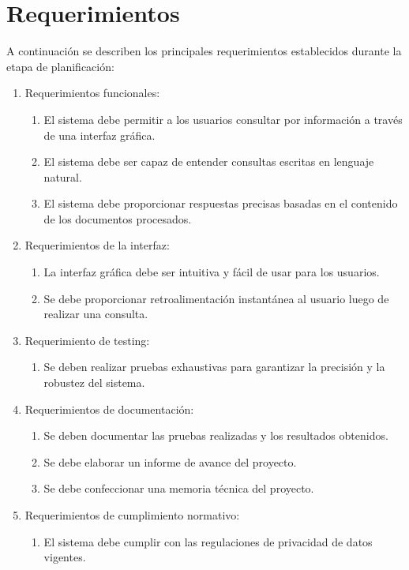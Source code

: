 \vspace{10mm}

\section{Requerimientos}

A continuación se describen los principales requerimientos establecidos durante la etapa de planificación:

\begin{enumerate}
	\item Requerimientos funcionales:
		\begin{enumerate}
			\item El sistema debe permitir a los usuarios consultar por información a través de una interfaz gráfica.
			\item El sistema debe ser capaz de entender consultas escritas en lenguaje natural.
			\item El sistema debe proporcionar respuestas precisas basadas en el contenido de los documentos procesados.
		\end{enumerate}
	\item Requerimientos de la interfaz:
		\begin{enumerate}
	  		\item La interfaz gráfica debe ser intuitiva y fácil de usar para los usuarios.
	  		\item Se debe proporcionar retroalimentación instantánea al usuario luego de realizar una consulta.
	  	\end{enumerate}
	\item Requerimiento de testing:
	  	\begin{enumerate}
	  		\item Se deben realizar pruebas exhaustivas para garantizar la precisión y la robustez del sistema.
	  	\end{enumerate}
	\vspace{10mm}
	\item Requerimientos de documentación:
		\begin{enumerate}
			\item Se deben documentar las pruebas realizadas y los resultados obtenidos.
			\item Se debe elaborar un informe de avance del proyecto.
			\item Se debe confeccionar una memoria técnica del proyecto.
		\end{enumerate}
	\item Requerimientos de cumplimiento normativo:
		\begin{enumerate}
			\item El sistema debe cumplir con las regulaciones de privacidad de datos vigentes.
		\end{enumerate}
\end{enumerate}